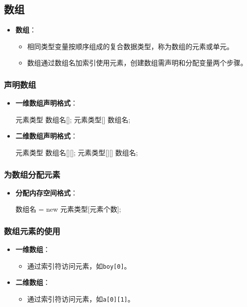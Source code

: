 \documentclass[a4paper, 10pt]{ctexart}
\begin{document}
\subsection{数组}
\begin{itemize}
  \item \textbf{数组}：
  \begin{itemize}
    \item 相同类型变量按顺序组成的复合数据类型，称为数组的元素或单元。
    \item 数组通过数组名加索引使用元素，创建数组需声明和分配变量两个步骤。
  \end{itemize}
\end{itemize}

\subsubsection{声明数组}
\begin{itemize}
  \item \textbf{一维数组声明格式}：
  \begin{codeblock}
元素类型 数组名[];
元素类型[] 数组名;
  \end{codeblock}
  \item \textbf{二维数组声明格式}：
  \begin{codeblock}
元素类型 数组名[][];
元素类型[][] 数组名;
  \end{codeblock}
\end{itemize}

\subsubsection{为数组分配元素}
\begin{itemize}
  \item \textbf{分配内存空间格式}：
  \begin{codeblock}
数组名 = new 元素类型[元素个数];
  \end{codeblock}
\end{itemize}

\subsubsection{数组元素的使用}
\begin{itemize}
  \item \textbf{一维数组}：
  \begin{itemize}
    \item 通过索引符访问元素，如\texttt{boy[0]}。
  \end{itemize}
  \item \textbf{二维数组}：
  \begin{itemize}
    \item 通过索引符访问元素，如\texttt{a[0][1]}。
  \end{itemize}
\end{itemize}
\end{document}
